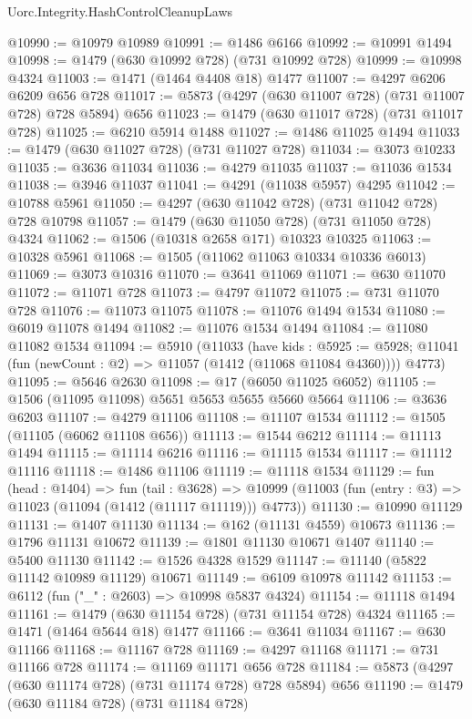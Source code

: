 \begin{lexlean}{Uorc.Integrity.HashControlCleanupLaws}
\begin{coremodule}
@10990 := @10979 @10989
@10991 := @1486 @6166
@10992 := @10991 @1494
@10998 := @1479 (@630 @10992 @728) (@731 @10992 @728)
@10999 := @10998 @4324
@11003 := @1471 (@1464 @4408 @18) @1477
@11007 := @4297 @6206 @6209 @656 @728
@11017 := @5873 (@4297 (@630 @11007 @728) (@731 @11007 @728) @728 @5894) @656
@11023 := @1479 (@630 @11017 @728) (@731 @11017 @728)
@11025 := @6210 @5914 @1488
@11027 := @1486 @11025 @1494
@11033 := @1479 (@630 @11027 @728) (@731 @11027 @728)
@11034 := @3073 @10233
@11035 := @3636 @11034
@11036 := @4279 @11035
@11037 := @11036 @1534
@11038 := @3946 @11037
@11041 := @4291 (@11038 @5957) @4295
@11042 := @10788 @5961
@11050 := @4297 (@630 @11042 @728) (@731 @11042 @728) @728 @10798
@11057 := @1479 (@630 @11050 @728) (@731 @11050 @728) @4324
@11062 := @1506 (@10318 @2658 @171) @10323 @10325
@11063 := @10328 @5961
@11068 := @1505 (@11062 @11063 @10334 @10336 @6013)
@11069 := @3073 @10316
@11070 := @3641 @11069
@11071 := @630 @11070
@11072 := @11071 @728
@11073 := @4797 @11072
@11075 := @731 @11070 @728
@11076 := @11073 @11075
@11078 := @11076 @1494 @1534
@11080 := @6019 @11078 @1494
@11082 := @11076 @1534 @1494
@11084 := @11080 @11082 @1534
@11094 := @5910
    (@11033
      (have kids : @5925 := @5928;
      @11041 (fun (newCount : @2) => @11057 (@1412 (@11068 @11084 @4360))))
      @4773)
@11095 := @5646 @2630
@11098 := @17 (@6050 @11025 @6052)
@11105 := @1506 (@11095 @11098) @5651 @5653 @5655 @5660 @5664
@11106 := @3636 @6203
@11107 := @4279 @11106
@11108 := @11107 @1534
@11112 := @1505 (@11105 (@6062 @11108 @656))
@11113 := @1544 @6212
@11114 := @11113 @1494
@11115 := @11114 @6216
@11116 := @11115 @1534
@11117 := @11112 @11116
@11118 := @1486 @11106
@11119 := @11118 @1534
@11129 := fun (head : @1404) =>
  fun (tail : @3628) =>
  @10999 (@11003 (fun (entry : @3) => @11023 (@11094 (@1412 (@11117 @11119))) @4773))
@11130 := @10990 @11129
@11131 := @1407 @11130
@11134 := @162 (@11131 @4559) @10673
@11136 := @1796 @11131 @10672
@11139 := @1801 @11130 @10671 @1407
@11140 := @5400 @11130
@11142 := @1526 @4328 @1529
@11147 := @11140 (@5822 @11142 @10989 @11129) @10671
@11149 := @6109 @10978 @11142
@11153 := @6112 (fun ("_" : @2603) => @10998 @5837 @4324)
@11154 := @11118 @1494
@11161 := @1479 (@630 @11154 @728) (@731 @11154 @728) @4324
@11165 := @1471 (@1464 @5644 @18) @1477
@11166 := @3641 @11034
@11167 := @630 @11166
@11168 := @11167 @728
@11169 := @4297 @11168
@11171 := @731 @11166 @728
@11174 := @11169 @11171 @656 @728
@11184 := @5873 (@4297 (@630 @11174 @728) (@731 @11174 @728) @728 @5894) @656
@11190 := @1479 (@630 @11184 @728) (@731 @11184 @728)

\end{coremodule}
\end{lexlean}
